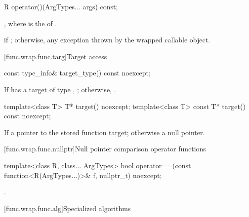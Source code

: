 %
\begin{itemdecl}
R operator()(ArgTypes... args) const;
\end{itemdecl}

\begin{itemdescr}
\pnum
\returns
{},
where  is the  of .

\pnum
\throws
{} if ; otherwise, any
exception thrown by the wrapped callable object.
\end{itemdescr}

[func.wrap.func.targ]{Target access}

%
\begin{itemdecl}
const type_info& target_type() const noexcept;
\end{itemdecl}

\begin{itemdescr}
\pnum
\returns
If  has a target of type ,
  ; otherwise, .
\end{itemdescr}

%
\begin{itemdecl}
template<class T>       T* target() noexcept;
template<class T> const T* target() const noexcept;
\end{itemdecl}

\begin{itemdescr}
\pnum
\returns
If 
a pointer to the stored function target; otherwise a null pointer.
\end{itemdescr}

[func.wrap.func.nullptr]{Null pointer comparison operator functions}

%
\begin{itemdecl}
template<class R, class... ArgTypes>
  bool operator==(const function<R(ArgTypes...)>& f, nullptr_t) noexcept;
\end{itemdecl}

\begin{itemdescr}
\pnum
\returns
{}.
\end{itemdescr}

[func.wrap.func.alg]{Specialized algorithms}

